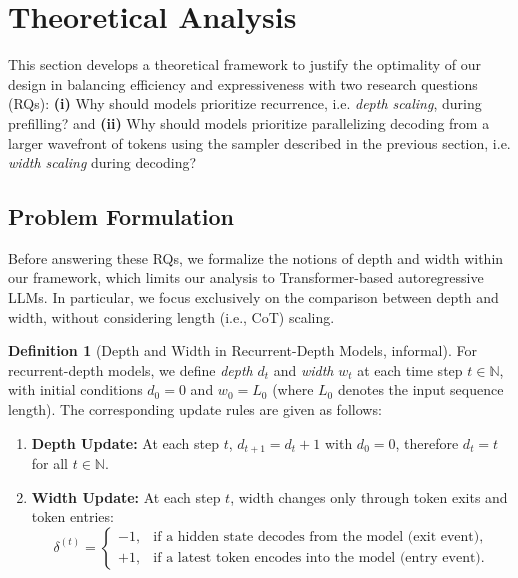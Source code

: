 \documentclass{article} %
\theoremstyle{definition}
\newtheorem{definition}[theorem]{Definition}
\theoremstyle{plain}
\begin{document}
\vspace{-1em}
\section{Theoretical Analysis}

This section develops a theoretical framework to justify the optimality of our design in balancing efficiency and expressiveness with two research questions (RQs): \textbf{(i)} Why should models prioritize recurrence, i.e. \textit{depth scaling}, during prefilling? and \textbf{(ii)} Why should models prioritize parallelizing decoding from a larger wavefront of tokens using the sampler described in the previous section, i.e. \textit{width scaling} during decoding?

\vspace{-1em}
\subsection{Problem Formulation}

Before answering these RQs, we formalize the notions of depth and width within our framework, which limits our analysis to Transformer-based autoregressive LLMs. In particular, we focus exclusively on the comparison between depth and width, without considering length (i.e., CoT) scaling.

\begin{definition}[Depth and Width in Recurrent-Depth Models, informal]
For recurrent-depth models, we define \emph{depth} $d_t$ and \emph{width} $w_t$ at each time step $t \in \mathbb{N}$, with initial conditions $d_0 = 0$ and $w_0 = L_0$ (where $L_0$ denotes the input sequence length). The corresponding update rules are given as follows:
\begin{enumerate}[itemsep=1pt,topsep=0pt,leftmargin=*]
\item \textbf{Depth Update:} At each step $t$, $d_{t+1} = d_t + 1$ with $d_0 = 0$, therefore $d_t = t$ for all $t \in \mathbb{N}$.
\item \textbf{Width Update:} At each step $t$, width changes only through token exits and token entries:
\[
\delta^{(t)} =
\begin{cases}
-1, & \text{if a hidden state decodes from the model (exit event)},\\
+1, & \text{if a latest token encodes into the model (entry event)}.
\end{cases}
\]
\end{enumerate}
\end{definition}
\end{document}
